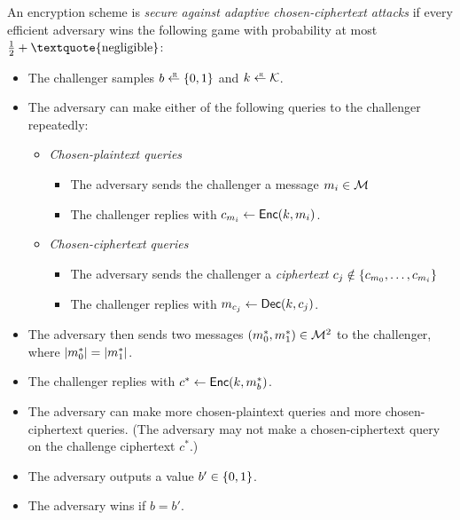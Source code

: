 \begin{definition}\label{defn:cca}
An encryption scheme is \emph{secure against 
adaptive chosen-ciphertext attacks}
if every efficient adversary wins the following 
game with probability at most $\tfrac{1}{2} + \text{\textquote{negligible}}$:

  \begin{itemize}[noitemsep]
		\item The challenger samples $b \rgets \bin$ and $k \rgets \calK$.
    \item The adversary can make either of the following queries to the challenger
      repeatedly:
      \begin{itemize}
    \item \emph{Chosen-plaintext queries}
          \begin{itemize}
            \item The adversary sends the challenger a message $m_i \in \mathcal{M}$
						\item The challenger replies with $c_{m_i} \gets \mathsf{Enc}(k, m_i)$.
          \end{itemize}
    \item \emph{Chosen-ciphertext queries}
          \begin{itemize}
						\item The adversary sends the challenger a \emph{ciphertext} $c_j \notin \left\{ c_{m_0}, \ldots, c_{m_i} \right\}$
						\item The challenger replies with $m_{c_j} \gets \mathsf{Dec}(k, c_j)$.
          \end{itemize}
      \end{itemize}
    \item The adversary then sends two messages $(m^*_0, m^*_1) \in \mathcal{M}^2$ to the challenger,
          where $\left| m^*_0 \right| = \left| m^*_1 \right|$.
    \item The challenger replies with $c^* \gets \mathsf{Enc}(k, m^*_b)$.
    \item The adversary can make more chosen-plaintext queries
      and more chosen-ciphertext queries. (The adversary may not
      make a chosen-ciphertext query on the challenge ciphertext $c^*$.)
		\item The adversary outputs a value $b' \in \{0,1\}$.
    \item The adversary wins if $b=b'$. 
	\end{itemize}
\end{definition}


